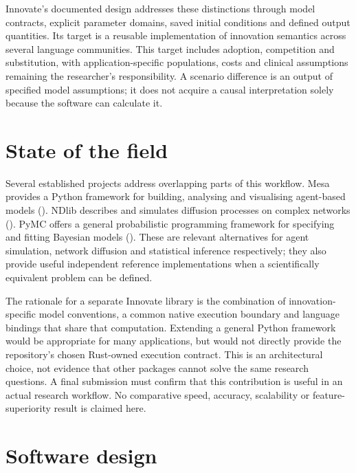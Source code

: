 \documentclass[10pt,a4paper,onecolumn]{article}
\begin{document}
Innovate's documented design addresses these distinctions through model
contracts, explicit parameter domains, saved initial conditions and
defined output quantities. Its target is a reusable implementation of
innovation semantics across several language communities. This target
includes adoption, competition and substitution, with
application-specific populations, costs and clinical assumptions
remaining the researcher's responsibility. A scenario difference is an
output of specified model assumptions; it does not acquire a causal
interpretation solely because the software can calculate it.

\section{State of the field}\label{state-of-the-field}

Several established projects address overlapping parts of this workflow.
Mesa provides a Python framework for building, analysing and visualising
agent-based models (). NDlib
describes and simulates diffusion processes on complex networks
(). PyMC offers a general
probabilistic programming framework for specifying and fitting Bayesian
models (). These are
relevant alternatives for agent simulation, network diffusion and
statistical inference respectively; they also provide useful independent
reference implementations when a scientifically equivalent problem can
be defined.

The rationale for a separate Innovate library is the combination of
innovation-specific model conventions, a common native execution
boundary and language bindings that share that computation. Extending a
general Python framework would be appropriate for many applications, but
would not directly provide the repository's chosen Rust-owned execution
contract. This is an architectural choice, not evidence that other
packages cannot solve the same research questions. A final submission
must confirm that this contribution is useful in an actual research
workflow. No comparative speed, accuracy, scalability or
feature-superiority result is claimed here.

\section{Software design}\label{software-design}
\end{document}

